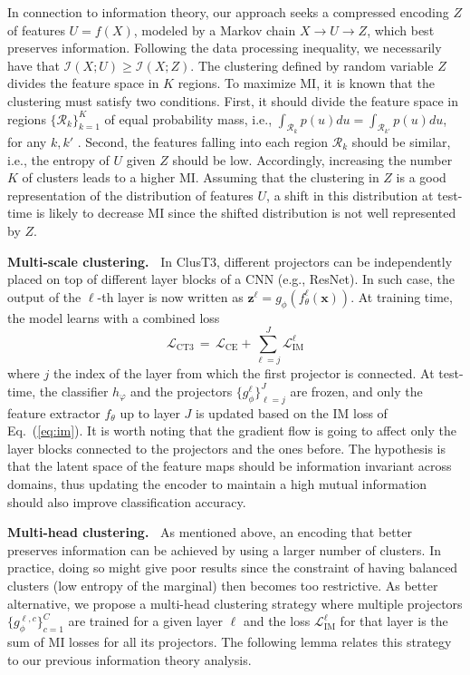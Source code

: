 \documentclass{article}
\newcommand{\mypar}[1]{\vspace{3pt}\noindent\textbf{#1~}}
\newcommand{\zz}{\mathbf{z}}
\newcommand{\xx}{\mathbf{x}}
\newcommand{\mr}[1]{\mathrm{#1}}
\begin{document}
In connection to information theory, our approach seeks a compressed encoding $Z$ of features $U\!=\!f(X)$, modeled by a Markov chain $X\!\to\!U\!\to\!Z$, which best preserves information. Following the data processing inequality, we necessarily have that $\mathcal{I}(X; U) \geq \mathcal{I}(X; Z)$. The clustering defined by random variable $Z$ divides the feature space in $K$ regions. To maximize MI, it is known that the clustering must satisfy two conditions. First, it should divide the feature space in regions $\{\mathcal{R}_k\}_{k\!=\!1}^K$ of equal probability mass, i.e., $\int_{\mathcal{R}_k} p(u) du = \int_{\mathcal{R}_{k'}} p(u) du$, for any $k,k'$
\cite{mackay2003information}. Second, the features falling into each region $\mathcal{R}_k$ should be similar, i.e., the entropy of $U$ given $Z$ should be low. Accordingly, increasing the number $K$ of clusters leads to a higher MI. Assuming that the clustering in $Z$ is a good representation of the distribution of features $U$, a shift in this distribution at test-time is likely to decrease MI since the shifted distribution is not well represented by $Z$.  

\mypar{Multi-scale clustering.} In ClusT3, different projectors can be independently placed on top of different layer blocks of a CNN (e.g., ResNet). In such case, the output of the $\ell$-th layer is now written as $\zz^{\ell}\!=\!g_{\phi}(f_{\theta}^{\ell}(\xx))$. At training time, the model learns with a combined loss 
\begin{equation}
    \mathcal{L}_{\mr{CT3}} \, = \, \mathcal{L}_{\mr{CE}} + \sum_{\ell=j}^{J}\mathcal{L}_{\mr{IM}}^{\ell}
\label{eq:loss}
\end{equation}
where $j$ the index of the layer from which the first projector is connected. At test-time, the classifier $h_\varphi$ and the projectors $\{g_{\phi}^{\ell}\}_{\ell=j}^{J}$ are frozen, and only the feature extractor $f_{\theta}$ up to layer $J$ is updated based on the IM loss of Eq.~(\ref{eq:im}). It is worth noting that the gradient flow is going to affect only the layer blocks connected to the projectors and the ones before. The hypothesis is that the latent space of the feature maps should be information invariant across domains, thus updating the encoder to maintain a high mutual information should also improve classification accuracy.

\mypar{Multi-head clustering.} As mentioned above, an encoding that better preserves information can be achieved by using a larger number of clusters. In practice, doing so might give poor results since the constraint of having balanced clusters (low entropy of the marginal) then becomes too restrictive. As better alternative, we propose a multi-head clustering strategy where multiple projectors $\{g_{\phi}^{\ell,c}\}_{c=1}^{C}$ are trained for a given layer $\ell$ and the loss $\mathcal{L}_{\mr{IM}}^\ell$ for that layer is the sum of MI losses for all its projectors. The following lemma relates this strategy to our previous information theory analysis.
\end{document}
